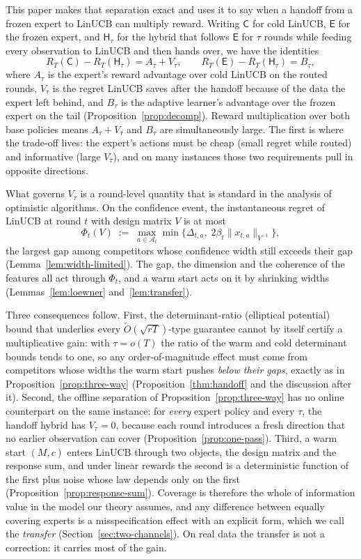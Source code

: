 \documentclass{article}
\theoremstyle{definition}
\theoremstyle{remark}
\theoremstyle{remark}
\newcommand{\Cold}{\mathsf{C}}
\newcommand{\Exp}{\mathsf{E}}
\newcommand{\Hyb}{\mathsf{H}}
\begin{document}
This paper makes that separation exact and uses it to say when a handoff from
a frozen expert to LinUCB can multiply reward. Writing $\Cold$ for cold LinUCB,
$\Exp$ for the frozen expert, and $\Hyb_\tau$ for the hybrid that follows
$\Exp$ for $\tau$ rounds while feeding every observation to LinUCB and then
hands over, we have the identities
\[
R_T(\Cold)-R_T(\Hyb_\tau)=A_\tau+V_\tau,
\qquad
R_T(\Exp)-R_T(\Hyb_\tau)=B_\tau,
\]
where $A_\tau$ is the expert's reward advantage over cold LinUCB on the routed
rounds, $V_\tau$ is the regret LinUCB saves after the handoff because of the
data the expert left behind, and $B_\tau$ is the adaptive learner's advantage
over the frozen expert on the tail (Proposition~\ref{prop:decomp}). Reward
multiplication over both base policies means $A_\tau+V_\tau$ and $B_\tau$ are
simultaneously large. The first is where the trade-off lives: the expert's
actions must be cheap (small regret while routed) and informative (large
$V_\tau$), and on many instances those two requirements pull in opposite
directions.

What governs $V_\tau$ is a round-level quantity that is standard in the
analysis of optimistic algorithms. On the confidence event,
the instantaneous regret of LinUCB at round $t$ with design matrix $V$ is at
most
\[
\Phi_t(V)\;:=\;\max_{a\in\mathcal A_t}\min\bigl\{\Delta_{t,a},\;2\beta_t\|x_{t,a}\|_{V^{-1}}\bigr\},
\]
the largest gap among competitors whose confidence width still exceeds their
gap (Lemma~\ref{lem:width-limited}). The gap, the dimension and the
coherence of the features all act through $\Phi_t$, and a warm start acts on it
by shrinking widths (Lemmas~\ref{lem:loewner} and~\ref{lem:transfer}).

Three consequences follow. First, the determinant-ratio (elliptical potential)
bound that underlies every $\widetilde O(\sqrt{rT})$-type guarantee cannot by
itself certify a multiplicative gain: with $\tau=o(T)$ the ratio of the warm
and cold determinant bounds tends to one, so any order-of-magnitude effect must
come from competitors whose widths the warm start pushes \emph{below their
gaps}, exactly as in Proposition~\ref{prop:three-way}
(Proposition~\ref{thm:handoff} and the discussion after it). Second, the offline
separation of Proposition~\ref{prop:three-way} has no online counterpart on
the same instance: for \emph{every} expert policy and every $\tau$, the
handoff hybrid has $V_\tau=0$, because each round introduces a fresh direction
that no earlier observation can cover (Proposition~\ref{prop:one-pass}).
Third, a warm start $(M,c)$ enters LinUCB through two objects, the design
matrix and the response sum, and under linear rewards the second is a
deterministic function of the first plus noise whose law depends only on the
first (Proposition~\ref{prop:response-sum}). Coverage is therefore the whole
of information value in the model our theory assumes, and any difference
between equally covering experts is a misspecification effect with an explicit
form, which we call the \emph{transfer} (Section~\ref{sec:two-channels}).
On real data the transfer is not a correction: it carries most of the gain.
\end{document}
